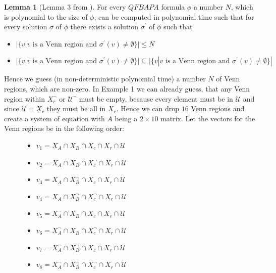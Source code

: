 \documentclass{book}
\theoremstyle{break}
\theoremstyle{definition}
\newtheorem{mylem}{Lemma}
\begin{document}
\begin{mylem}[Lemma 3 from \cite{4}]
For every $QFBAPA$ formula $\phi$ a number $N$, which is polynomial to the size of $\phi$, can be computed in polynomial time such that for every solution $\sigma$ of $\phi$ there exists a solution $\sigma^\prime$ of $\phi$ such that
\begin{itemize}
\item $|\{v|v\text{ is a Venn region and }\sigma^\prime(v)\neq \emptyset\}|\leq N$
\item $|\{v|v\text{ is a Venn region and }\sigma^\prime(v)\neq \emptyset\}|\subseteq |\{v|v\text{ is a Venn region and }\sigma^\prime(v)\neq \emptyset\}|$
\end{itemize}
\end{mylem}
Hence we guess (in non-deterministic polynomial time) a number $N$ of Venn regions, which are non-zero. In Example 1 we can already guess, that any Venn region within $X_r^\neg$ or $\mathcal{U}^\neg$ must be empty, because every element must be in $\mathcal{U}$ and since $\mathcal{U}=X_r$ they must be all in $X_r$. Hence we can drop $16$ Venn regions and create a system of equation with $A$ being a $2\times 10$ matrix. Let the vectors for the Venn regions be in the following order:
\begin{figure}[H]
\begin{minipage}[t]{.5\textwidth}
\raggedright
\begin{itemize}
\item $v_1=X_A\cap X_B\cap X_c\cap X_r\cap\mathcal{U}$
\item $v_2=X_A\cap X_B\cap X_c^\neg\cap X_r\cap\mathcal{U}$
\item $v_3=X_A\cap X_B^\neg\cap X_c\cap X_r\cap\mathcal{U}$
\item $v_4=X_A\cap X_B^\neg\cap X_c^\neg\cap X_r\cap\mathcal{U}$
\end{itemize}
\end{minipage}%
\begin{minipage}[t]{.5\textwidth}
\raggedleft
\begin{itemize}
\item $v_5=X_A^\neg\cap X_B\cap X_c\cap X_r\cap\mathcal{U}$
\item $v_6=X_A^\neg\cap X_B\cap X_c^\neg\cap X_r\cap\mathcal{U}$
\item $v_7=X_A^\neg\cap X_B^\neg\cap X_c\cap X_r\cap\mathcal{U}$
\item $v_8=X_A^\neg\cap X_B^\neg\cap X_c^\neg\cap X_r\cap\mathcal{U}$
\end{itemize}
\end{minipage}
\end{figure}
\end{document}
